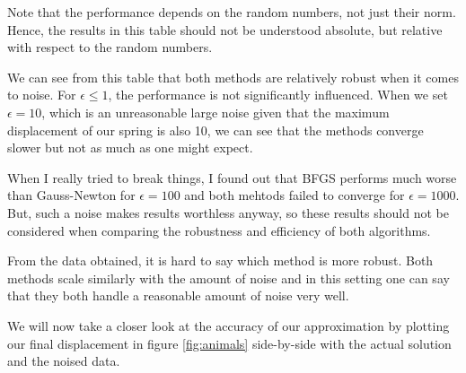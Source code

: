 \documentclass{article}
\begin{document}
Note that the performance depends on the random numbers, not just their norm. Hence, the results
in this table should not be understood absolute, but relative with respect to the random
numbers.  \par
We can see from this table that both methods are relatively robust when it comes to noise.
For $\epsilon\leq 1$, the performance is not significantly influenced. When we set $\epsilon=10$,
which is an unreasonable large noise given that the maximum displacement of our spring is also 10,
we can see that the methods converge slower but not as much as one might expect.\par
When I really tried to break things, I found out that BFGS performs much worse than Gauss-Newton
for $\epsilon=100$ and both mehtods failed to converge for $\epsilon=1000$. But, such a noise
makes results worthless anyway, so these results should not be considered when comparing the 
robustness and efficiency of both algorithms.\par
From the data obtained, it is hard to say which method is more robust. Both methods scale similarly
with the amount of noise and in this setting one can say that they both handle a reasonable amount
of noise very well.\par
We will now take a closer look at the accuracy of our approximation by
plotting our final displacement in figure \ref{fig:animals}  side-by-side with the actual solution and
the noised data.
\end{document}
